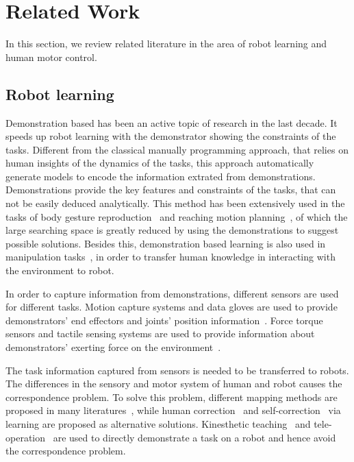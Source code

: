 \section{Related Work}
\label{sec:related}
In this section, we review related literature in the area of robot learning and human motor control.


\subsection{Robot learning}
\label{sec:imitation}
Demonstration based has been an active topic of research in the last decade. It speeds up robot learning with the demonstrator showing the constraints of the tasks.
Different from the classical manually programming approach, that relies on human insights of the dynamics of the tasks, this approach automatically generate models to encode the information extrated from demonstrations. Demonstrations provide the key features and constraints of the tasks, that can not be easily deduced analytically. This method has been extensively used in the tasks of body gesture reproduction~\cite{hsiao2005imitation,calinon2010learning,kulic2012incremental} and reaching motion planning~\cite{Ekvall07,shukla2012coupled,mohammad2014learning}, of which the large searching space is greatly reduced by using the demonstrations to suggest possible solutions. Besides this, demonstration based learning is also used in manipulation tasks~\cite{petkos2006learning,sauser2011iterative,Miao2014}, in order to transfer human knowledge in interacting with the environment to robot.

In order to capture information from demonstrations, different sensors are used for different tasks. Motion capture systems and data gloves are used to provide demonstrators' end effectors and joints' position information~\cite{calinon2007incremental,asfour2008imitation,kulic2012incremental,bidan2013robio}. Force torque sensors and tactile sensing systems are used to provide information about demonstrators' exerting force on the environment~\cite{sauser2011iterative,Miao2014}. 

The task information captured from sensors is needed to be transferred to robots. The differences in the sensory and motor system of human and robot causes the correspondence problem.
To solve this problem, different mapping methods are proposed in many literatures~\cite{asfour2008imitation,koenemann2012whole,kulic2012incremental}, while human correction~\cite{calinon2007incremental,sauser2011iterative,romano2011human} and self-correction~\cite{bidan2013robio} via learning are proposed as alternative solutions. Kinesthetic teaching~\cite{korkinof2013online,pais2014encoding} and tele-operation~\cite{Fischer98} are used to directly demonstrate a task on a robot and hence avoid the correspondence problem.

